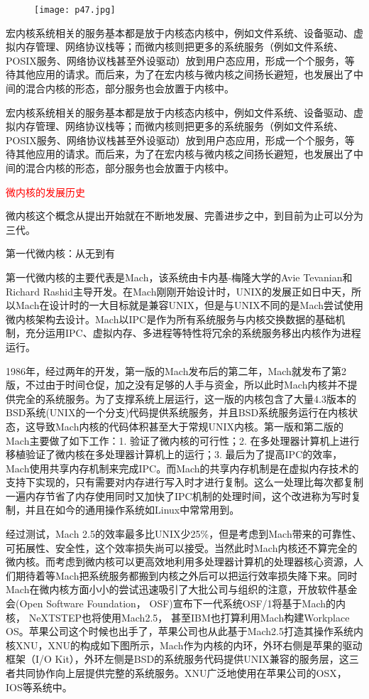 \documentclass[utf8]{book}
\begin{document}
	\begin{figure}[H]
	\centering
	\texttt{[image: p47.jpg]}
	\end{figure}

宏内核系统相关的服务基本都是放于内核态内核中，例如文件系统、设备驱动、虚拟内存管理、网络协议栈等；而微内核则把更多的系统服务（例如文件系统、POSIX服务、网络协议栈甚至外设驱动）放到用户态应用，形成一个个服务，等待其他应用的请求。而后来，为了在宏内核与微内核之间扬长避短，也发展出了中间的混合内核的形态，部分服务也会放置于内核中。

宏内核系统相关的服务基本都是放于内核态内核中，例如文件系统、设备驱动、虚拟内存管理、网络协议栈等；而微内核则把更多的系统服务（例如文件系统、POSIX服务、网络协议栈甚至外设驱动）放到用户态应用，形成一个个服务，等待其他应用的请求。而后来，为了在宏内核与微内核之间扬长避短，也发展出了中间的混合内核的形态，部分服务也会放置于内核中。

{\Large \textcolor{red}{微内核的发展历史}}

微内核这个概念从提出开始就在不断地发展、完善进步之中，到目前为止可以分为三代。

{\large 第一代微内核：从无到有}

第一代微内核的主要代表是Mach，该系统由卡内基-梅隆大学的Avie Tevanian和Richard Rashid主导开发。在Mach刚刚开始设计时，UNIX的发展正如日中天，所以Mach在设计时的一大目标就是兼容UNIX，但是与UNIX不同的是Mach尝试使用微内核架构去设计。Mach以IPC是作为所有系统服务与内核交换数据的基础机制，充分运用IPC、虚拟内存、多进程等特性将冗余的系统服务移出内核作为进程运行。

1986年，经过两年的开发，第一版的Mach发布后的第二年，Mach就发布了第2版，不过由于时间仓促，加之没有足够的人手与资金，所以此时Mach内核并不提供完全的系统服务。为了支撑系统上层运行，这一版的内核包含了大量4.3版本的BSD系统(UNIX的一个分支)代码提供系统服务，并且BSD系统服务运行在内核状态，这导致Mach内核的代码体积甚至大于常规UNIX内核。第一版和第二版的Mach主要做了如下工作：1. 验证了微内核的可行性；2. 在多处理器计算机上进行移植验证了微内核在多处理器计算机上的运行；3. 最后为了提高IPC的效率，Mach使用共享内存机制来完成IPC。而Mach的共享内存机制是在虚拟内存技术的支持下实现的，只有需要对内存进行写入时才进行复制。这么一处理比每次都复制一遍内存节省了内存使用同时又加快了IPC机制的处理时间，这个改进称为写时复制，并且在如今的通用操作系统如Linux中常常用到。

经过测试，Mach 2.5的效率最多比UNIX少25\%，但是考虑到Mach带来的可靠性、可拓展性、安全性，这个效率损失尚可以接受。当然此时Mach内核还不算完全的微内核。而考虑到微内核可以更高效地利用多处理器计算机的处理器核心资源，人们期待着等Mach把系统服务都搬到内核之外后可以把运行效率损失降下来。同时Mach在微内核方面小小的尝试迅速吸引了大批公司与组织的注意，开放软件基金会(Open Software Foundation， OSF)宣布下一代系统OSF/1将基于Mach的内核， NeXTSTEP也将使用Mach2.5， 甚至IBM也打算利用Mach构建Workplace OS。苹果公司这个时候也出手了，苹果公司也从此基于Mach2.5打造其操作系统内核XNU，XNU的构成如下图所示，Mach作为内核的内环，外环右侧是苹果的驱动框架（I/O Kit），外环左侧是BSD的系统服务代码提供UNIX兼容的服务层，这三者共同协作向上层提供完整的系统服务。XNU广泛地使用在苹果公司的OSX，IOS等系统中。
\end{document}

